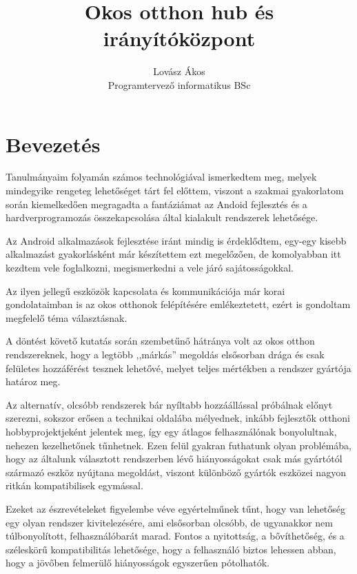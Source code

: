 \documentclass[
]{thesis-ekf}
\theoremstyle{definition}
\theoremstyle{remark}
\begin{document}
\title{Okos otthon hub és irányítóközpont}
\author{Lovász Ákos\\Programtervező informatikus BSc}
\date{\the\year{}}
\maketitle
\tableofcontents


\chapter*{Bevezetés}
Tanulmányaim folyamán számos technológiával ismerkedtem meg, melyek mindegyike rengeteg
lehetőséget tárt fel előttem, viszont a szakmai gyakorlatom során kiemelkedően megragadta a fantáziámat az Andoid
fejlesztés és a hardverprogramozás összekapcsolása által kialakult rendszerek lehetősége.


Az Android alkalmazások fejlesztése iránt mindig is érdeklődtem, egy-egy kisebb alkalmazást gyakorlásként
már készítettem ezt megelőzően, de komolyabban itt kezdtem vele foglalkozni, megismerkedni a vele járó
sajátosságokkal.


Az ilyen jellegű eszközök kapcsolata és kommunikációja már korai gondolataimban is az okos otthonok felépítésére
emlékeztetett, ezért is gondoltam megfelelő téma választásnak.


A döntést követő kutatás során szembetűnő hátránya volt az okos otthon rendszereknek, hogy a legtöbb ,,márkás''
megoldás elsősorban drága és csak felületes hozzáférést tesznek lehetővé, melyet teljes mértékben a rendszer
gyártója határoz meg. 


Az alternatív, olcsóbb rendszerek bár nyíltabb hozzáállással próbálnak előnyt szerezni,
sokszor erősen a technikai oldalába mélyednek, inkább fejlesztők otthoni hobbyprojektjeként jelentek meg, 
így egy átlagos felhasználónak bonyolultnak, nehezen kezelhetőnek tűnhetnek. Ezen felül gyakran futhatunk 
olyan problémába, hogy az általunk választott rendszerben lévő hiányosságokat csak más gyártótól származó 
eszköz nyújtana megoldást, viszont különböző gyártók eszközei nagyon ritkán kompatibilisek egymással.


Ezeket az észrevételeket figyelembe véve egyértelműnek tűnt, hogy van lehetőség egy olyan rendszer kivitelezésére,
ami elsősorban olcsóbb, de ugyanakkor nem túlbonyolított, felhasználóbarát marad. Fontos a nyitottság, a bővíthetőség,
és a széleskörű kompatibilitás lehetősége, hogy a felhasználó biztos lehessen abban, hogy a jövőben felmerülő
hiányosságok egyszerűen pótolhatók.
\end{document}
